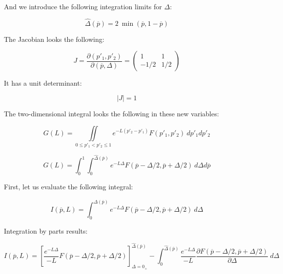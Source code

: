 \documentclass{article}
\theoremstyle{definition}
\begin{document}
And we introduce the following integration limits for $\Delta$:

\begin{equation}
    \hat{\Delta}(\overline{p}) = 2 \ \min(\overline{p},1-\overline{p})
\end{equation}

The Jacobian looks the following:

\begin{equation}
    J = \frac{\partial (p'_1,p'_2)}{\partial (\overline{p},\Delta)} =
    \begin{pmatrix}
    1 & 1 \\
    -1/2 & 1/2
    \end{pmatrix}
\end{equation}

It has a unit determinant:

\begin{equation}
    |J| = 1
\end{equation}

The two-dimensional integral looks the following in these new variables:

\begin{equation}
    G(L)
    =
    \iint\limits_{0 \le p'_1 < p'_2 \le 1}
    e^{-L (p'_2-p'_1)}
    F(p'_1,p'_2) \ dp'_1 dp'_2
\end{equation}

\begin{equation}
    G(L)
    =
    \int_0^1 \int_0^{\hat{\Delta}(\overline{p})} e^{- L \Delta} 
    F(\overline{p} - \Delta/2, \overline{p} + \Delta/2) 
    \ d\Delta d\overline{p}
\end{equation}

First, let us evaluate the following integral:

\begin{equation}
    I(\overline{p},L)
    =
    \int_0^{\hat{\Delta}(\overline{p})} e^{- L \Delta} 
    F(\overline{p} - \Delta/2, \overline{p} + \Delta/2) 
    \ d\Delta 
\end{equation}

Integration by parts results:

\begin{equation}
    I(\overline{p},L)
    =
    \left [
    \frac{e^{- L \Delta}}{- L} 
    F(\overline{p} - \Delta/2, \overline{p} + \Delta/2) 
    \right ]_{\Delta=0_+}^{\hat{\Delta}(\overline{p})}
    -
    \int_0^{\hat{\Delta}(\overline{p})}
    \frac{e^{- L \Delta}}{- L} 
    \frac{\partial
    F(\overline{p} - \Delta/2, \overline{p} + \Delta/2) 
    }{\partial \Delta}
    \ d \Delta
\end{equation}
\end{document}
